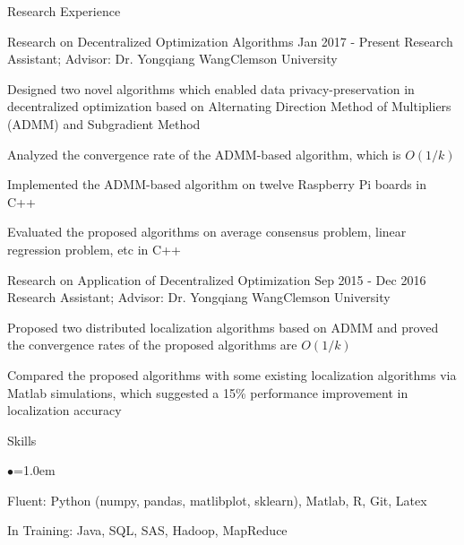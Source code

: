 \documentclass{resume} %
\begin{document}

\begin{rSection}{Research Experience}	
\begin{rSubsection}{Research on Decentralized Optimization Algorithms }
{Jan 2017 - Present }{Research Assistant; Advisor: Dr. Yongqiang Wang}{Clemson University}

 \setlength{\parindent}{2em}
 \item Designed two novel algorithms which enabled data privacy-preservation in decentralized optimization based on Alternating Direction Method of Multipliers (ADMM) and Subgradient Method
\item Analyzed the convergence rate of the ADMM-based algorithm, which is $O(1/k)$
\item Implemented the ADMM-based algorithm on twelve Raspberry Pi boards in C++
\item Evaluated the proposed algorithms on average consensus problem, linear regression problem, etc in C++
\end{rSubsection}	
		

\begin{rSubsection}{Research on Application of Decentralized Optimization}{ Sep 2015 - Dec 2016  }{Research Assistant; Advisor: Dr. Yongqiang Wang}{Clemson University}
       \item Proposed two distributed localization algorithms based on ADMM and proved the convergence rates of the proposed algorithms are $O(1/k)$
		\item Compared the proposed algorithms with some existing localization algorithms via Matlab simulations, which suggested a 15\% performance improvement in localization accuracy 
\end{rSubsection}
\end{rSection}


\vspace{-0.15cm}
\begin{rSection}{Skills}
  \begin{list}{$\bullet$}{\leftmargin=1.0em}
  	\item Fluent: Python (numpy, pandas, matlibplot, sklearn), Matlab, R, Git, Latex 
  	\item In Training: Java, SQL, SAS, Hadoop, MapReduce 
  	\end{list}
\end{rSection}
\end{document}
